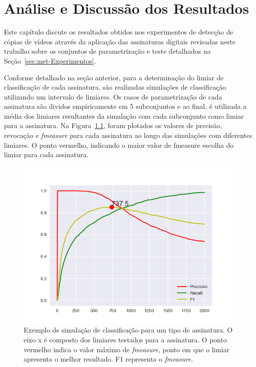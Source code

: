 
\chapter{Análise e Discussão dos Resultados}
\label{chap:resultados}

Este capítulo discute os resultados obtidos nos experimentos de detecção de cópias de vídeos através da aplicação das assinaturas digitais revisadas neste trabalho sobre os conjuntos de parametrização e teste detalhados na Seção~\ref{sec:met-Experimentos}.

Conforme detalhado na seção anterior, para a determinação do limiar de classificação de cada assinatura, são realizadas simulações de classificação utilizando um intervalo de limiares. Os casos de parametrização de cada assinatura são dividos empiricamente em 5 subconjuntos e ao final, é utilizada a média dos limiares resultantes da simulação com cada subconjunto como limiar para a assinatura. Na Figura~\ref{fig:exemplo-simulacao}, foram plotados os valores de precisão, revocação e \textit{fmeasure} para cada assinatura ao longo das simulações com diferentes limiares. O ponto vermelho, indicando o maior valor de fmeasure escolha do limiar para cada assinatura.

\begin{figure}[h]
	\centering
	\caption{Exemplo de simulação de classificação para um tipo de assinatura. O eixo x é composto dos limiares testados para a assinatura. O ponto vermelho indica o valor máximo de \textit{fmeasure}, ponto em que o limiar apresenta o melhor resultado. F1 representa o \textit{fmeasure}.}
	\label{fig:exemplo-simulacao}
	\includegraphics[width=\textwidth]{dados/figuras/experimentos/limiar_Medida_Ordinal_0.png}
\end{figure}

